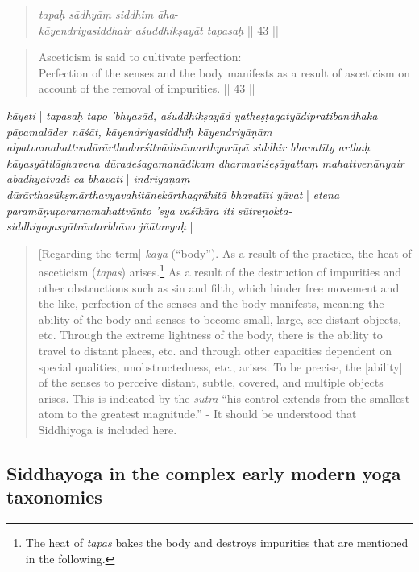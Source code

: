 \begin{quote}
\textit{tapaḥ sādhyāṃ siddhim āha}- \\
\textit{kāyendriyasiddhair aśuddhikṣayāt tapasaḥ} || 43 ||
\end{quote}
\begin{quote}
  Asceticism is said to cultivate perfection:\\
  Perfection of the senses and the body manifests as a result of asceticism on account of the removal of impurities. || 43 ||
\end{quote}
\textit{kāyeti} | \textit{tapasaḥ tapo 'bhyasād, aśuddhikṣayād yatheṣṭagatyādipratibandhaka pāpamalāder nāśāt, kāyendriyasiddhiḥ kāyendriyāṇām alpatvamahattvadūrārthadarśitvādisāmarthyarūpā siddhir bhavatīty arthaḥ} | \textit{kāyasyātilāghavena dūradeśagamanādikaṃ dharmaviśeṣāyattaṃ mahattvenānyair abādhyatvādi ca bhavati} | \textit{indriyāṇāṃ dūrārthasūkṣmārthavyavahitānekārthagrāhitā bhavatīti yāvat} | \textit{etena paramāṇuparamamahattvānto 'sya vaśīkāra iti sūtreṇokta- siddhiyogasyātrāntarbhāvo jñātavyaḥ} |
\begin{quote}
[Regarding the term] \textit{kāya} (``body''). As a result of the practice, the heat of asceticism (\textit{tapas}) arises.\footnote{The heat of \textit{tapas} bakes the body and destroys impurities that are mentioned in the following.} As a result of the destruction of impurities and other obstructions such as sin and filth, which hinder free movement and the like, perfection of the senses and the body manifests, meaning the ability of the body and senses to become small, large, see distant objects, etc. Through the extreme lightness of the body, there is the ability to travel to distant places, etc. and through other capacities dependent on special qualities, unobstructedness, etc., arises. To be precise, the [ability] of the senses to perceive distant, subtle, covered, and multiple objects arises. This is indicated by the \textit{sūtra} ``his control extends from the smallest atom to the greatest magnitude.'' - It should be understood that Siddhiyoga is included here. 
\end{quote}

\subsection{Siddhayoga in the complex early modern yoga taxonomies}


